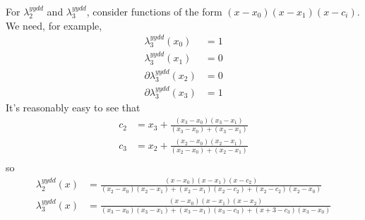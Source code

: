 For $\lambda^{yydd}_2$ and $\lambda^{yydd}_3$, 
consider functions of the form $(x-x_0)(x-x_1)(x-c_i)$.
We need, for example, 
\begin{align}
\lambda^{yydd}_3(x_0) & = 1 \\ 
\lambda^{yydd}_3(x_1) & = 0 \nonumber \\
\partial\lambda^{yydd}_3(x_2) & = 0 \nonumber \\
\partial\lambda^{yydd}_3(x_3) & = 1 \nonumber 
\end{align}
It's reasonably easy to see that 
\begin{align}
c_2 & = x_3 + 
\frac{(x_3 - x_0)(x_3 - x_1)}{(x_3 - x_0) + (x_3 - x_1)} \\
c_3 & = x_2 + 
\frac{(x_2 - x_0)(x_2 - x_1)}{(x_2 - x_0) + (x_2 - x_1)} \\
\end{align}
so
\begin{align}
\lambda^{yydd}_2(x) & =
\frac{(x-x_0)(x-x_1)(x-c_2)}
{
(x_2-x_0)(x_2-x_1) +
(x_2-x_1)(x_2-c_2) +
(x_2-c_2)(x_2-x_0)}
\\
\lambda^{yydd}_3(x) & =
\frac{(x-x_0)(x-x_1)(x-x_2)}
{
(x_3-x_0)(x_3-x_1) +
(x_3-x_1)(x_3-c_3) +
(x+3-c_3)(x_3-x_0)}
\nonumber
\end{align}
